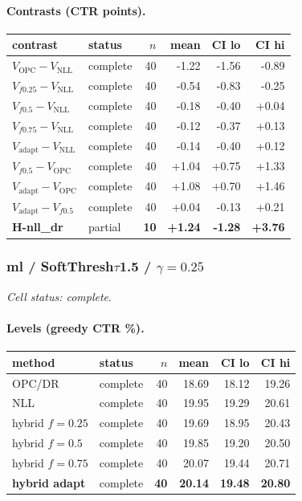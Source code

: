 \documentclass[10pt,a4paper]{article}
\begin{document}
\paragraph{Contrasts (CTR points).}
{\centering\small\begin{tabular}{llrrrr}
\toprule contrast & status & $n$ & mean & CI lo & CI hi \\
\midrule
$V_{\mathrm{OPC}}-V_{\mathrm{NLL}}$ & complete & 40 & -1.22 & -1.56 & -0.89 \\
$V_{f0.25}-V_{\mathrm{NLL}}$ & complete & 40 & -0.54 & -0.83 & -0.25 \\
$V_{f0.5}-V_{\mathrm{NLL}}$ & complete & 40 & -0.18 & -0.40 & +0.04 \\
$V_{f0.75}-V_{\mathrm{NLL}}$ & complete & 40 & -0.12 & -0.37 & +0.13 \\
$V_{\mathrm{adapt}}-V_{\mathrm{NLL}}$ & complete & 40 & -0.14 & -0.40 & +0.12 \\
$V_{f0.5}-V_{\mathrm{OPC}}$ & complete & 40 & +1.04 & +0.75 & +1.33 \\
$V_{\mathrm{adapt}}-V_{\mathrm{OPC}}$ & complete & 40 & +1.08 & +0.70 & +1.46 \\
$V_{\mathrm{adapt}}-V_{f0.5}$ & complete & 40 & +0.04 & -0.13 & +0.21 \\
\textbf{H-nll\_dr} & partial & \textbf{10} & \textbf{+1.24} & \textbf{-1.28} & \textbf{+3.76} \\
\bottomrule\end{tabular}\par}
\bigskip
\subsubsection{ml / SoftThresh$\tau$1.5 / $\gamma=0.25$}
\emph{Cell status: complete}.
\paragraph{Levels (greedy CTR \%).}
{\centering\small\begin{tabular}{llrrrr}
\toprule method & status & $n$ & mean & CI lo & CI hi \\
\midrule
OPC/DR & complete & 40 & 18.69 & 18.12 & 19.26 \\
NLL & complete & 40 & 19.95 & 19.29 & 20.61 \\
hybrid $f{=}0.25$ & complete & 40 & 19.69 & 18.95 & 20.43 \\
hybrid $f{=}0.5$ & complete & 40 & 19.85 & 19.20 & 20.50 \\
hybrid $f{=}0.75$ & complete & 40 & 20.07 & 19.44 & 20.71 \\
\textbf{hybrid adapt} & complete & \textbf{40} & \textbf{20.14} & \textbf{19.48} & \textbf{20.80} \\
\bottomrule\end{tabular}\par}
\end{document}
